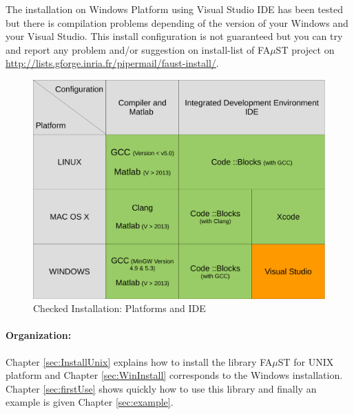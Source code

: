 The installation on Windows Platform using Visual Studio IDE has been tested but there is compilation problems depending of the version of your Windows and your Visual Studio. This install configuration is not guaranteed but you can try and report any problem and/or suggestion on install-list of FA$\mu$ST project on \url{http://lists.gforge.inria.fr/pipermail/faust-install/}. 

\begin{figure}[H] %
\centering
\includegraphics[scale=0.4]{images/recapInstall.pdf}
\caption{Checked Installation: Platforms and IDE}
\label{fig:recapInstall}
\end{figure}


\paragraph{Organization:}Chapter \ref{sec:InstallUnix} explains how to install the library FA$\mu$ST for UNIX platform and Chapter \ref{sec:WinInstall} corresponds to the Windows installation. Chapter \ref{sec:firstUse} shows quickly how to use this library and finally an example is given Chapter \ref{sec:example}. 
